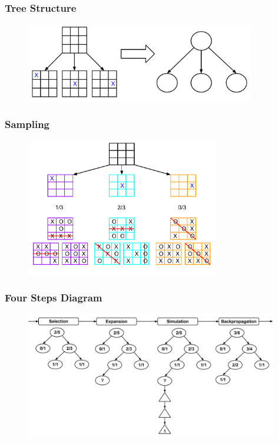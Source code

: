 \documentclass{beamer}
\begin{document}
\begin{frame}[fragile]
\frametitle{Tree Structure}
\begin{figure}[h]
	\includegraphics[width=10cm]{Diagrams/TicTacToe/MapToTree.pdf}
	\centering
\end{figure}
\end{frame}

\begin{frame}[fragile]
\frametitle{Sampling}
\begin{figure}[h]
	\includegraphics[width=8.5cm]{Diagrams/TicTacToe/TicTacToeTreeSampling.pdf}
	\centering
\end{figure}
\end{frame}


\begin{frame}[fragile]
\frametitle{Four Steps Diagram}
\begin{figure}[h]
	\includegraphics[width=11cm]{Diagrams/FourSteps/MCTSFourStepProcessWhole.pdf}
	\centering
\end{figure}
\end{frame}
\end{document}
